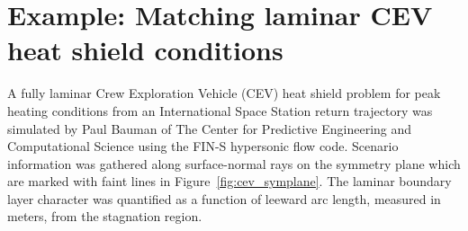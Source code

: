 \documentclass[letterpaper,11pt,nointlimits,reqno]{amsart}
\newcommand{\Mach}[1][]{\mbox{Ma}_{#1}}
\begin{document}

\section{Example: Matching laminar CEV heat shield conditions}

A fully laminar Crew Exploration Vehicle (CEV) heat shield problem for peak
heating conditions from an International Space Station return trajectory was
simulated by Paul Bauman of The Center for Predictive Engineering and
Computational Science using the FIN-S hypersonic flow
code\citep{KirkModeling2013}.  Scenario information was gathered along
surface-normal rays on the symmetry plane which are marked with faint lines in
Figure~\ref{fig:cev_symplane}.  The laminar boundary layer character was
quantified as a function of leeward arc length, measured in meters, from the
stagnation region.
\end{document}
